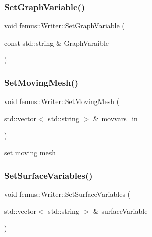 \subsubsection{\texorpdfstring{Set\+Graph\+Variable()}{SetGraphVariable()}}
{\footnotesize\ttfamily void femus\+::\+Writer\+::\+Set\+Graph\+Variable (\begin{DoxyParamCaption}\item[{const std\+::string \&}]{Graph\+Varaible }\end{DoxyParamCaption})}

\mbox{\label{classfemus_1_1_writer_ac484a2d3a8969473e4c8569da644e111}} 
\subsubsection{\texorpdfstring{Set\+Moving\+Mesh()}{SetMovingMesh()}}
{\footnotesize\ttfamily void femus\+::\+Writer\+::\+Set\+Moving\+Mesh (\begin{DoxyParamCaption}\item[{std\+::vector$<$ std\+::string $>$ \&}]{movvars\+\_\+in }\end{DoxyParamCaption})}

set moving mesh \mbox{\label{classfemus_1_1_writer_a4af0281b254bd3da0e5ea79008bfd9b4}} 
\subsubsection{\texorpdfstring{Set\+Surface\+Variables()}{SetSurfaceVariables()}}
{\footnotesize\ttfamily void femus\+::\+Writer\+::\+Set\+Surface\+Variables (\begin{DoxyParamCaption}\item[{std\+::vector$<$ std\+::string $>$ \&}]{surface\+Variable }\end{DoxyParamCaption})}

\mbox{\label{classfemus_1_1_writer_a066d61d2539069edbb156f42b5b69222}} 
